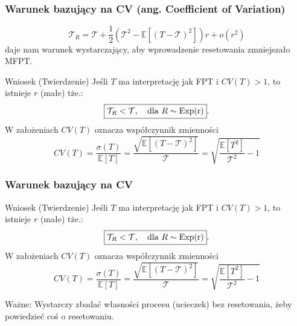 \documentclass{beamer}
\newcommand{\E}{\mathbb{E}}
\newcommand{\1}{\mathbb{1}}
\newcommand{\T}{\mathcal{T}}
\begin{document}
\begin{frame}
\frametitle{Warunek bazujący na CV (ang. Coefficient of Variation)}
\begin{equation}
\T_R = \T + \frac{1}{2} \left ( \T^2 - \E [(T - \T)^2] \right ) r + o(r^2)
\end{equation}
daje nam warunek wystarczający, aby wprowadzenie resetowania zmniejszało MFPT.
\pause
\begin{block}{Wniosek (Twierdzenie)}
Jeśli $T$ ma interpretację jak FPT i $CV(T) > 1$, to istnieje $r$ (małe) tże.: 
\begin{equation}
\boxed{ \T_R < \T, \quad \text{dla}~ R \sim \rm{Exp}(r) }.
\end{equation}
W założeniach $CV(T)$ oznacza współczynnik zmienności 
\begin{equation}
CV(T) = \frac{\sigma(T)}{\E [T]} = \frac{\sqrt{ \E [(T - \T)^2] }}{\T} = \sqrt{\frac{\E [T^2]}{\T^2} - 1}
\end{equation}
\end{block}

\end{frame}

\begin{frame}
\frametitle{Warunek bazujący na CV}
\begin{block}{Wniosek (Twierdzenie)}
Jeśli $T$ ma interpretację jak FPT i $CV(T) > 1$, to istnieje $r$ (małe) tże.: 
\begin{equation}
\boxed{ \T_R < \T, \quad \text{dla}~ R \sim \rm{Exp}(r) }.
\end{equation}
W założeniach $CV(T)$ oznacza współczynnik zmienności 
\begin{equation}
CV(T) = \frac{\sigma(T)}{\E [T]} = \frac{\sqrt{ \E [(T - \T)^2] }}{\T} = \sqrt{\frac{\E [T^2]}{\T^2} - 1}
\end{equation}
\end{block}

Ważne: {\color{magenta}
Wystarczy zbadać własności procesu (ucieczek) bez resetowania, żeby powiedzieć coś o resetowaniu.
}
\end{frame}
\end{document}
